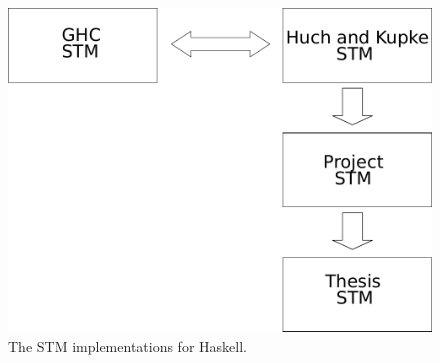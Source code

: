 \begin{figure}
\centering
\includegraphics[scale=0.8]{Figures/implementations}
\decoRule
\caption[implementations]{The STM implementations for Haskell.}
\label{fig:implementations}
\end{figure}

